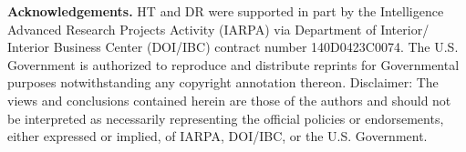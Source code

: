 \documentclass{article}
\begin{document}
{\bf Acknowledgements.} HT and DR were supported in part by the Intelligence Advanced Research Projects Activity (IARPA) via Department of Interior/ Interior Business Center (DOI/IBC) contract number 140D0423C0074. The U.S. Government is authorized to reproduce and distribute reprints for Governmental purposes notwithstanding any copyright annotation thereon. Disclaimer: The views and conclusions contained herein are those of the authors and should not be interpreted as necessarily representing the official policies or endorsements, either expressed or implied, of IARPA, DOI/IBC, or the U.S. Government.

\clearpage

{\small


}


\end{document}
